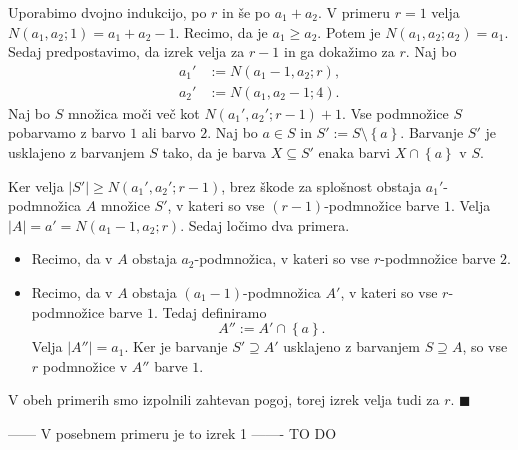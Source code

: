 \documentclass[twoside,11pt]{article}
\providecommand{\set}[1]{\left\{#1\right\}}
\providecommand{\abs}[1]{\left\lvert #1\right\rvert}
\begin{document}
\begin{dokaz}
    Uporabimo dvojno indukcijo, po $r$ in še po $a_1 + a_2$. 
    V primeru $r = 1$ velja $N(a_1, a_2; 1) = a_1 + a_2 -1$. Recimo, da je $a_1 \ge a_2$. Potem je 
    $N(a_1, a_2; a_2) = a_1$. Sedaj predpostavimo, da izrek velja za $r-1$ in ga dokažimo za $r$.
    Naj bo
    \begin{align*}
        a_1' &:= N(a_1 - 1, a_2; r), \\
        a_2' &:= N(a_1, a_2 -1; 4).
    \end{align*}
    Naj bo $S$ množica moči več kot $N(a_1', a_2'; r-1) + 1$. Vse podmnožice $S$ pobarvamo z 
    barvo $1$ ali barvo $2$. Naj bo $a \in S$ in $S' := S \setminus \set{a}$. Barvanje $S'$ je 
    usklajeno z barvanjem $S$ tako, da je barva $X \subseteq S'$ enaka barvi $X \cap \set{a}$ v $S$.

    Ker velja $\abs{S'} \ge N(a_1', a_2';r-1)$, brez škode za splošnost obstaja $a_1'$-podmnožica $A$ 
    množice $S'$, v kateri so vse $(r-1)$-podmnožice barve $1$. Velja $\abs{A} = a' = N(a_1-1,a_2;r)$.
    Sedaj ločimo dva primera.
    \begin{itemize}
        \item Recimo, da v $A$ obstaja $a_2$-podmnožica, v kateri so vse $r$-podmnožice barve $2$.
        \item Recimo, da v $A$ obstaja $(a_1-1)$-podmnožica $A'$, v kateri so vse $r$-podmnožice barve $1$. 
        Tedaj definiramo
        \[
            A'' := A' \cap \set{a}.
        \]
        Velja $\abs{A''} = a_1$. Ker je barvanje $S' \supseteq A'$ usklajeno z barvanjem $S \supseteq A$, 
        so vse $r$ podmnožice v $A''$ barve $1$.
    \end{itemize}
    V obeh primerih smo izpolnili zahtevan pogoj, torej izrek velja tudi za $r$. \hfill $\blacksquare$
\end{dokaz}

------ V posebnem primeru je to izrek 1 -------  TO DO
\end{document}
